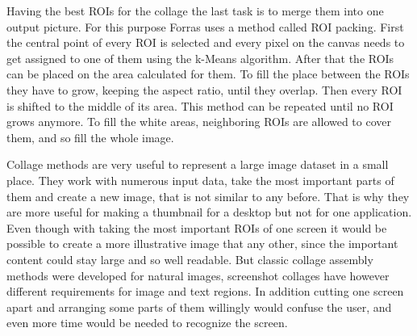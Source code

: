 \documentclass[draft,final]{vutinfth} %
\begin{document}
Having the best ROIs for the collage the last task is to merge them into one output picture.
For this purpose Forras uses a method called ROI packing.
First the central point of every ROI is selected and every pixel on the canvas needs to get assigned to one of them using the k-Means algorithm.
After that the ROIs can be placed on the area calculated for them.
To fill the place between the ROIs they have to grow, keeping the aspect ratio, until they overlap. 
Then every ROI is shifted to the middle of its area.
This method can be repeated until no ROI grows anymore.
To fill the white areas, neighboring ROIs are allowed to cover them, and so fill the whole image.\par
Collage methods are very useful to represent a large image dataset in a small place.
They work with numerous input data, take the most important parts of them and create a new image, that is not similar to any before.
That is why they are more useful for making a thumbnail for a desktop but not for one application.
Even though with taking the most important ROIs of one screen it would be possible to create a  more illustrative image that any other, since the important content could stay large and so well readable.
But classic collage assembly methods were developed for natural images, screenshot collages have however different requirements for image and text regions.
In addition cutting one screen apart and arranging some parts of them willingly would confuse the user, and even more time would be needed to recognize the screen.
\end{document}
